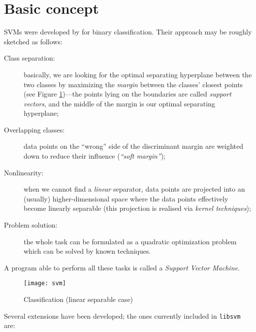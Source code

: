 \documentclass[a4paper]{article}
\begin{document}
\section*{Basic concept}
SVMs were developed by \cite{svm:cortes+vapnik:1995} for binary
classification. Their approach may be roughly sketched as follows:

\begin{description}
 \item[Class separation:] basically, we are looking for the optimal separating hyperplane
  between the two classes by maximizing the
  \textit{margin} between the classes' closest points (see Figure
  \ref{fig:svm1})---the points lying on the boundaries are called \textit{support vectors}, and
  the middle of the margin is our optimal separating hyperplane;
 \item[Overlapping classes:] data points on the ``wrong'' side
  of the discriminant margin are weighted down to reduce their influence (\textit{``soft margin''});
 \item[Nonlinearity:] when we cannot
  find a \textit{linear} separator, data points are projected into an 
  (usually) higher-dimensional space where the data points effectively
  become linearly separable (this projection is realised via \textit{kernel
    techniques});
 \item[Problem solution:] the whole task can be formulated as a
  quadratic optimization problem which can be solved by known techniques.
\end{description}
\noindent A program able to perform all these tasks is called a \textit{Support
  Vector Machine}.

\begin{figure}[htbp]
  \begin{center}
    \texttt{[image: svm]}
    \caption{Classification (linear separable case)}
    \label{fig:svm1}
  \end{center}
\end{figure}

Several extensions have been developed; the ones currently
included in \texttt{libsvm} are:
\end{document}
